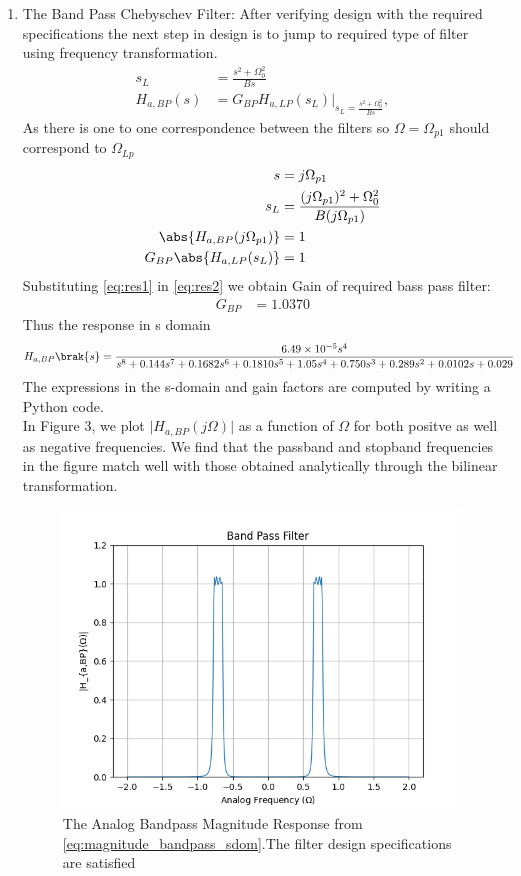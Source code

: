 \documentclass{article}
\begin{document}
\begin{enumerate}
\item {The Band Pass Chebyschev Filter:} 
After verifying design with the required specifications the next step in design is to jump to required type of filter using frequency transformation. 
\begin{align}
    s_L &= \frac{s^2 + \Omega_0^2}{Bs} \\
    H_{a,BP}(s) &= G_{BP}H_{a,LP}(s_L)\vert_{s_L = \frac{s^2 + \Omega_0^2}{Bs}},
\end{align}
As there is one to one correspondence between the filters so $\Omega=\Omega_{p1}$ should correspond to $\Omega_{Lp}$
\begin{align}
    s &= j\Omega_{p1}\\
    s_{L} &= \frac{(j\Omega_{p1})^2 + \Omega_0^2}{B(j\Omega_{p1})} \label{eq:res1} \\ 
    \abs{H_{a,BP}(j\Omega_{p1})} &= 1 \\
    G_{BP}\abs{H_{a,LP}(s_L)} &= 1 \label{eq:res2}
\end{align}
Substituting \eqref{eq:res1} in \eqref{eq:res2} we obtain Gain of required bass pass filter:
\begin{align}
    G_{BP} &= 1.0370 
\end{align}
Thus the response in s domain 
\begin{align}
    H_{a,BP}\brak{s} &= \frac{6.49\times 10^{-5}s^4}{s^8 + 0.144s^7 + 0.1682s^6 + 0.1810s^5 + 1.05s^4 + 0.750s^3 + 0.289s^2 + 0.0102s + 0.029} \label{eq:magnitude_bandpass_sdom}
\end{align}
The expressions in the s-domain and gain factors are computed by writing a Python code. \\
In Figure 3, we plot $\vert H_{a,BP}(j\Omega)\vert$ as a function of $\Omega$ for both positve as
well as negative frequencies.  We find that the passband and stopband frequencies in the figure
match well with those obtained analytically through the bilinear transformation.
\begin{figure}[H]
\centering
\includegraphics[width=1\columnwidth]{figs/Band_Pass_Filter.png}
\caption{The Analog Bandpass Magnitude Response from \eqref{eq:magnitude_bandpass_sdom}.The filter design specifications are satisfied}
\label{fig:band_pass_filter}
\end{figure}
\end{enumerate}
\end{document}
